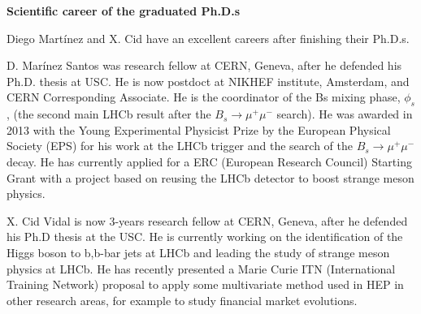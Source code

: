 {\bf Scientific career of the graduated Ph.D.s}

Diego Mart\'inez and X. Cid have an excellent careers after finishing their Ph.D.s. 

D. Mar\'inez Santos was research fellow at CERN, Geneva, after he defended his Ph.D. thesis at USC. He is now postdoct at NIKHEF institute, Amsterdam, and CERN Corresponding Associate. He is the coordinator of the Bs mixing phase, $\phi_s$, (the second main LHCb result after the $B_s \to \mu^+\mu^-$ search). He was awarded in 2013 with the Young Experimental Physicist Prize by the European Physical Society (EPS) for his work at the LHCb trigger and the search of the $B_s \to \mu^+ \mu^-$ decay. He has currently applied for a ERC (European Research Council) Starting Grant with a project based on reusing the LHCb detector to boost strange meson physics. 

X. Cid Vidal is now 3-years research fellow at CERN, Geneva, after he defended his Ph.D thesis at the USC. He is currently working on the identification of the Higgs boson to b,b-bar jets at LHCb and leading the study of strange meson physics at LHCb. He has recently presented a Marie Curie ITN  (International Training Network) proposal to apply some multivariate method used in HEP in other research areas, for example to study financial market evolutions.
 


